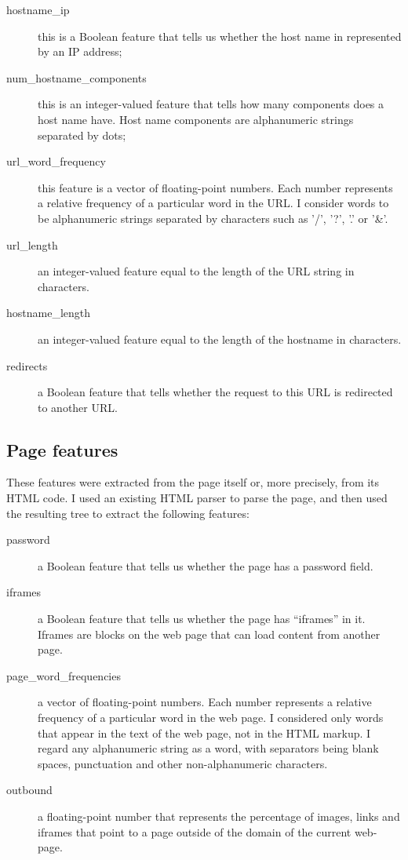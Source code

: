 \documentclass{article}
\begin{document}
\begin{description}
\item[hostname\_ip] this is a Boolean feature that tells us whether the
  host name in represented by an IP address;

\item[num\_hostname\_components] this is an integer-valued feature that
  tells how many components does a host name have. Host name
  components are alphanumeric strings separated by dots;

\item[url\_word\_frequency] this feature is a vector of floating-point
  numbers. Each number represents a relative frequency of a particular
  word in the URL. I consider words to be alphanumeric strings
  separated by characters such as '/', '?', '.' or '\&'.

\item[url\_length] an integer-valued feature equal to the length of the
  URL string in characters.

\item[hostname\_length] an integer-valued feature equal to the length
  of the hostname in characters.

\item[redirects] a Boolean feature that tells whether the request to
  this URL is redirected to another URL.
\end{description}

\subsection{Page features}
\label{sec:page-features}

These features were extracted from the page itself or, more precisely,
from its HTML code. I used an existing HTML parser to parse the page,
and then used the resulting tree to extract the following features:
\begin{description}
\item[password] a Boolean feature that tells us whether the page has a
  password field.

\item[iframes] a Boolean feature that tells us whether the page has
  ``iframes'' in it. Iframes are blocks on the web page that can load
  content from another page.

\item[page\_word\_frequencies] a vector of floating-point
  numbers. Each number represents a relative frequency of a particular
  word in the web page. I considered only words that appear in the
  text of the web page, not in the HTML markup. I regard any
  alphanumeric string as a word, with separators being blank spaces,
  punctuation and other non-alphanumeric characters.

\item[outbound] a floating-point number that represents the percentage
  of images, links and iframes that point to a page outside of the
  domain of the current web-page.
\end{description}
\end{document}
